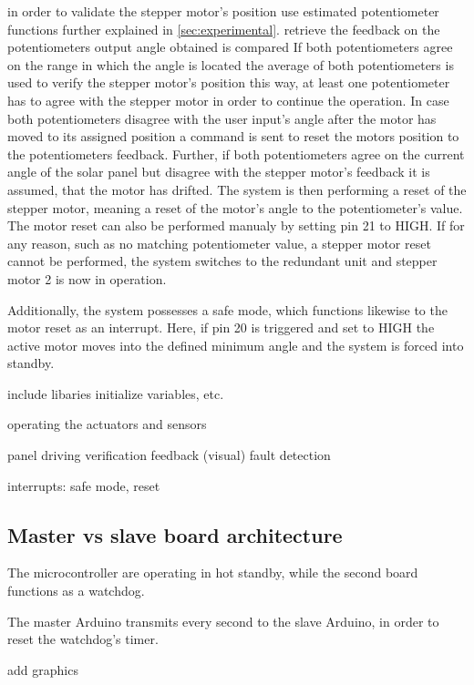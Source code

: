 in order to validate the stepper motor's position 
use estimated potentiometer functions further explained in \autoref{sec:experimental}. 
retrieve the feedback on the potentiometers output 
angle obtained is compared
If both potentiometers agree on the range in which the angle is located the average of both potentiometers is used to verify the stepper motor's position
this way, at least one potentiometer has to agree with the stepper motor in order to continue the operation.
In case both potentiometers disagree with the user input's angle after the motor has moved to its assigned position a command is sent to reset the motors position to the potentiometers feedback.
Further, if both potentiometers agree on the current angle of the solar panel but disagree with the stepper motor's feedback it is assumed, that the motor has drifted. The system is then performing a reset of the stepper motor, meaning a reset of the motor's angle to the potentiometer's value. The motor reset can also be performed manualy by setting pin 21 to HIGH. If for any reason, such as no matching potentiometer value, a stepper motor reset cannot be performed, the system switches to the redundant unit and stepper motor 2 is now in operation.

Additionally, the system possesses a safe mode, which functions likewise to the motor reset as an interrupt. Here, if pin 20 is triggered and set to HIGH the active motor moves into the defined minimum angle and the system is forced into standby.



include libaries
initialize variables, etc.

operating the actuators and sensors

panel driving
verification
feedback (visual)
fault detection

interrupts: safe mode, reset



\subsection{Master vs slave board architecture}
The microcontroller are operating in hot standby, while the second board functions as a watchdog.

The master Arduino transmits every second to the slave Arduino, in order to reset the watchdog's timer.






add graphics





